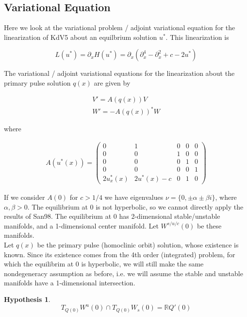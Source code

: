 \documentclass[12pt]{article}
\def\R{{\mathbb R}}
\newtheorem{hypothesis}{Hypothesis}
\begin{document}
\subsection*{Variational Equation}

Here we look at the variational problem / adjoint variational equation for the linearization of KdV5 about an equilbrium solution $u^*$. This linearization is

\begin{equation}
L(u^*) = \partial_x H(u^*) = \partial_x ( \partial_x^4 - \partial_x^2 + c - 2 u^*)
\end{equation}

The variational / adjoint variational equations for the linearization about the primary pulse solution $q(x)$ are given by

\begin{align}
V' = A(q(x))V \label{vareq} \\
W' = -A(q(x))^*W \label{adjvareq}
\end{align}

where

\begin{align}
A(u^*(x)) = \begin{pmatrix}0 & 1 & 0 & 0 & 0 \\0 & 0 & 1 & 0 & 0 \\0 & 0 & 0 & 1 & 0 \\0 & 0 & 0 & 0 & 1 \\
2u^*_x(x) & 2u^*(x) - c & 0 & 1 & 0 \end{pmatrix}
\end{align}

If we consider $A(0)$ for $c > 1/4$ we have eigenvalues $\nu = \{ 0, \pm \alpha \pm \beta i\}$, where $\alpha, \beta > 0$. The equilibrium at 0 is not hyperbolic, so we cannot directly apply the results of San98. The equilibrium at 0 has 2-dimensional stable/unstable manifolds, and a 1-dimensional center manifold. Let $W^{s/u/c}(0)$ be these manifolds.\\

Let $q(x)$ be the primary pulse (homoclinic orbit) solution, whose existence is known. Since its existence comes from the 4th order (integrated) problem, for which the equilibrim at 0 is hyperbolic, we will still make the same nondegeneracy assumption as before, i.e. we will assume the stable and unstable manifolds have a 1-dimensional intersection.

\begin{hypothesis}\label{nondegen}
\[
T_{Q(0)} W^u(0) \cap T_{Q(0)} W_s(0) = \R Q'(0)
\]
\end{hypothesis}
\end{document}
